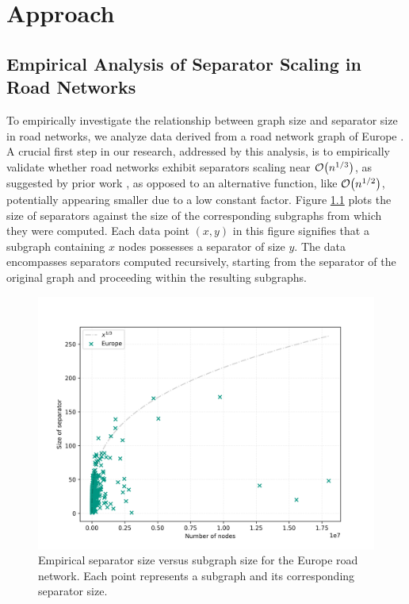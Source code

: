 \chapter{Approach}
\label{ch:experimental_analysis}


\section{Empirical Analysis of Separator Scaling in Road Networks}
\label{sec:empirical_analysis}

To empirically investigate the relationship between graph size and separator size in road networks, we analyze data derived from a road network graph of Europe \cite{ptv_group_dimacs-europe_2009}.
A crucial first step in our research, addressed by this analysis, is to empirically validate whether road networks exhibit separators scaling near \(\mathcal{O}\!\left(n^{1/3}\right)\), as suggested by prior work \cite{dibbelt_customizable_2016}, as opposed to an alternative function, like \(\mathcal{O}\!\left(n^{1/2}\right)\), potentially appearing smaller due to a low constant factor.
Figure \cref{fig:separator_size_vs_graph_size} plots the size of separators against the size of the corresponding subgraphs from which they were computed.
Each data point \( (x, y) \) in this figure signifies that a subgraph containing \( x \) nodes possesses a separator of size \( y \).
The data encompasses separators computed recursively, starting from the separator of the original graph and proceeding within the resulting subgraphs.

\begin{figure}
	\centering
	\includegraphics[width=0.7\linewidth]{graphics/Europe.png}
	\caption{Empirical separator size versus subgraph size for the Europe road network. Each point represents a subgraph and its corresponding separator size.}
	\label{fig:separator_size_vs_graph_size}
\end{figure}

